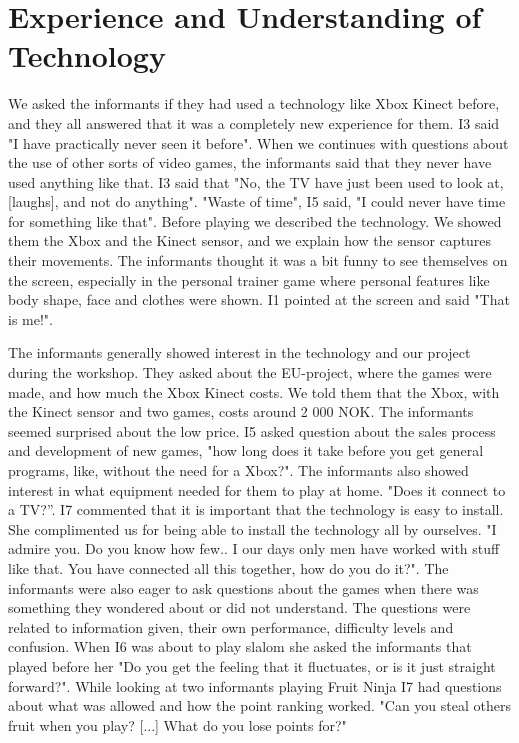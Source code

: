 \section{Experience and Understanding of Technology}
We asked the informants if they had used a technology like Xbox Kinect before, and they all answered that it was a completely new experience for them. I3 said "I have practically never seen it before". When we continues with questions about the use of other sorts of video games, the informants said that they never have used anything like that. I3 said that "No, the TV have just been used to look at, [laughs], and not do anything". "Waste of time", I5 said, "I could never have time for something like that".  Before playing we described the technology. We showed them the Xbox and the Kinect sensor, and we explain how the sensor captures their movements. The informants thought it was a bit funny to see themselves on the screen, especially in the personal trainer game where personal features like body shape, face and clothes were shown. I1 pointed at the screen and said "That is me!". 

The informants generally showed interest in the technology and our project during the workshop. They asked about the EU-project, where the games were made, and how much the Xbox Kinect costs. We told them that the Xbox, with the Kinect sensor and two games, costs around 2 000 NOK. The informants seemed surprised about the low price. I5 asked question about the sales process and development of new games, "how long does it take before you get general programs, like, without the need for a Xbox?". The informants also showed interest in what equipment needed for them to play at home. "Does it connect to a TV?”. I7 commented that it is important that the technology is easy to install. She complimented us for being able to install the technology all by ourselves. "I admire you. Do you know how few.. I our days only men have worked with stuff like that. You have connected all this together, how do you do it?".  The informants were also eager to ask questions about the games when there was something they wondered about or did not understand. The questions were related to information given, their own performance, difficulty levels and confusion. When I6 was about to play slalom she asked the informants that played before her "Do you get the feeling that it fluctuates, or is it just straight forward?". While looking at two informants playing Fruit Ninja I7 had questions about what was allowed and how the point ranking worked. "Can you steal others fruit when you play? [...] What do you lose points for?" 

